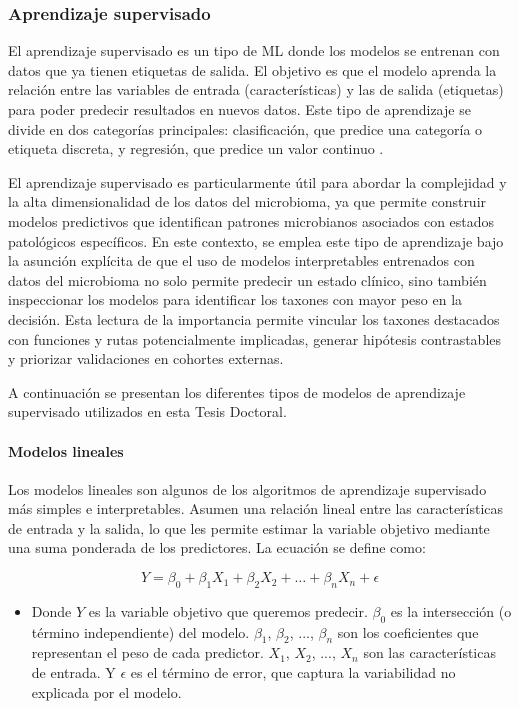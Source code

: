 \subsubsection{Aprendizaje supervisado}

El aprendizaje supervisado es un tipo de ML donde los modelos se entrenan con datos que ya tienen etiquetas de salida. El objetivo es que el modelo aprenda la relación entre las variables de entrada (características) y las de salida (etiquetas) para poder predecir resultados en nuevos datos. Este tipo de aprendizaje se divide en dos categorías principales: clasificación, que predice una categoría o etiqueta discreta, y regresión, que predice un valor continuo \cite{bishop2006pattern}.

El aprendizaje supervisado es particularmente útil para abordar la complejidad y la alta dimensionalidad de los datos del microbioma, ya que permite construir modelos predictivos que identifican patrones microbianos asociados con estados patológicos específicos. En este contexto, se emplea este tipo de aprendizaje bajo la asunción explícita de que el uso de modelos interpretables entrenados con datos del microbioma no solo permite predecir un estado clínico, sino también inspeccionar los modelos para identificar los taxones con mayor peso en la decisión. Esta lectura de la importancia permite vincular los taxones destacados con funciones y rutas potencialmente implicadas, generar hipótesis contrastables y priorizar validaciones en cohortes externas.

A continuación se presentan los diferentes tipos de modelos de aprendizaje supervisado utilizados en esta Tesis Doctoral.

\paragraph{Modelos lineales}

Los modelos lineales son algunos de los algoritmos de aprendizaje supervisado más simples e interpretables. Asumen una relación lineal entre las características de entrada y la salida, lo que les permite estimar la variable objetivo mediante una suma ponderada de los predictores. La ecuación se define como:

\begin{equation}
Y = \beta_0 + \beta_1 X_1 + \beta_2 X_2 + \ldots + \beta_n X_n + \epsilon
\end{equation}
\begin{itemize}
\item Donde $Y$ es la variable objetivo que queremos predecir. $\beta_0$ es la intersección (o término independiente) del modelo. $\beta_1$, $\beta_2$, ..., $\beta_n$ son los coeficientes que representan el peso de cada predictor. $X_1$, $X_2$, ..., $X_n$ son las características de entrada. Y $\epsilon$ es el término de error, que captura la variabilidad no explicada por el modelo.
\end{itemize}

